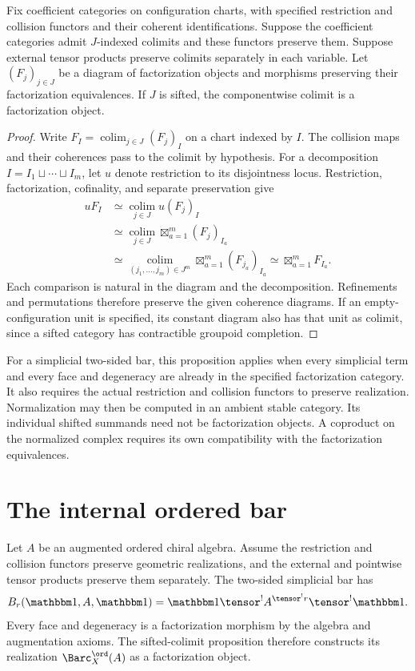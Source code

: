 \begin{proposition}
Fix coefficient categories on configuration charts, with specified
restriction and collision functors and their coherent identifications.
Suppose the coefficient categories admit $J$-indexed colimits
and these functors preserve them.
Suppose external tensor products preserve colimits separately in each variable.
Let $(F_j)_{j\in J}$ be a diagram of factorization objects and
morphisms preserving their factorization equivalences.
If $J$ is sifted, the componentwise colimit is a factorization object.
\end{proposition}
\begin{proof}
Write $F_I=\operatorname*{colim}_{j\in J}(F_j)_I$ on a chart indexed by $I$.
The collision maps and their coherences pass to the colimit by hypothesis.
For a decomposition $I=I_1\sqcup\cdots\sqcup I_m$, let $u$ denote
restriction to its disjointness locus.
Restriction, factorization, cofinality, and separate preservation give
\[
\begin{aligned}
 uF_I
 &\simeq\operatorname*{colim}_{j\in J}u(F_j)_I\\
 &\simeq\operatorname*{colim}_{j\in J}
        \mathop{\boxtimes}_{a=1}^m(F_j)_{I_a}\\
 &\simeq\operatorname*{colim}_{(j_1,\ldots,j_m)\in J^m}
        \mathop{\boxtimes}_{a=1}^m(F_{j_a})_{I_a}
 \simeq\mathop{\boxtimes}_{a=1}^m F_{I_a}.
\end{aligned}
\]
Each comparison is natural in the diagram and the decomposition.
Refinements and permutations therefore preserve the given coherence diagrams.
If an empty-configuration unit is specified, its constant diagram also
has that unit as colimit, since a sifted category has contractible groupoid completion.
\end{proof}

For a simplicial two-sided bar, this proposition applies when every
simplicial term and every face and degeneracy are already in the
specified factorization category.
It also requires the actual restriction and collision functors to preserve realization.
Normalization may then be computed in an ambient stable category.
Its individual shifted summands need not be factorization objects.
A coproduct on the normalized complex requires its own compatibility
with the factorization equivalences.

\chapter{The internal ordered bar}
Let $A$ be an augmented ordered chiral algebra.
Assume the restriction and collision functors preserve geometric realizations,
and the external and pointwise tensor products preserve them separately.
The two-sided simplicial bar has
\[
 B_r(\mathbbm1,A,\mathbbm1)=
 \mathbbm1\tensor^! A^{\tensor^!r}\tensor^!\mathbbm1.
\]
Every face and degeneracy is a factorization morphism by the algebra and augmentation axioms.
The sifted-colimit proposition therefore constructs its realization
$\Barc_X^{\ord}(A)$ as a factorization object.

